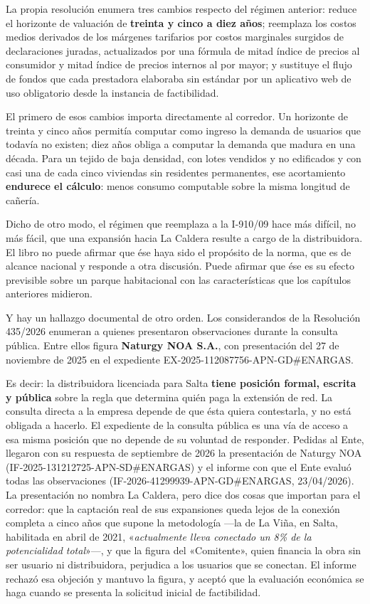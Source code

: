 La propia resolución enumera tres cambios respecto del régimen anterior: reduce el horizonte de valuación de \textbf{treinta y cinco a diez años}; reemplaza los costos medios derivados de los márgenes tarifarios por costos marginales surgidos de declaraciones juradas, actualizados por una fórmula de mitad índice de precios al consumidor y mitad índice de precios internos al por mayor; y sustituye el flujo de fondos que cada prestadora elaboraba sin estándar por un aplicativo web de uso obligatorio desde la instancia de factibilidad.

\begin{cautela}
El primero de esos cambios importa directamente al corredor. Un horizonte de treinta y cinco años permitía computar como ingreso la demanda de usuarios que todavía no existen; diez años obliga a computar la demanda que madura en una década. Para un tejido de baja densidad, con lotes vendidos y no edificados y con casi una de cada cinco viviendas sin residentes permanentes, ese acortamiento \textbf{endurece el cálculo}: menos consumo computable sobre la misma longitud de cañería.

Dicho de otro modo, el régimen que reemplaza a la I-910/09 hace más difícil, no más fácil, que una expansión hacia La Caldera resulte a cargo de la distribuidora. El libro no puede afirmar que ése haya sido el propósito de la norma, que es de alcance nacional y responde a otra discusión. Puede afirmar que ése es su efecto previsible sobre un parque habitacional con las características que los capítulos anteriores midieron.
\end{cautela}

Y hay un hallazgo documental de otro orden. Los considerandos de la Resolución 435/2026 enumeran a quienes presentaron observaciones durante la consulta pública. Entre ellos figura \textbf{Naturgy NOA S.A.}, con presentación del 27 de noviembre de 2025 en el expediente EX-2025-112087756-APN-GD\#ENARGAS.

Es decir: la distribuidora licenciada para Salta \textbf{tiene posición formal, escrita y pública} sobre la regla que determina quién paga la extensión de red. La consulta directa a la empresa depende de que ésta quiera contestarla, y no está obligada a hacerlo. El expediente de la consulta pública es una vía de acceso a esa misma posición que no depende de su voluntad de responder. Pedidas al Ente, llegaron con su respuesta de septiembre de 2026 la presentación de Naturgy NOA (IF-2025-131212725-APN-SD\#ENARGAS) y el informe con que el Ente evaluó todas las observaciones (IF-2026-41299939-APN-GD\#ENARGAS, 23/04/2026). La presentación no nombra La Caldera, pero dice dos cosas que importan para el corredor: que la captación real de sus expansiones queda lejos de la conexión completa a cinco años que supone la metodología ---la de La Viña, en Salta, habilitada en abril de 2021, «\textit{actualmente lleva conectado un 8\% de la potencialidad total}»---, y que la figura del «Comitente», quien financia la obra sin ser usuario ni distribuidora, perjudica a los usuarios que se conectan. El informe rechazó esa objeción y mantuvo la figura, y aceptó que la evaluación económica se haga cuando se presenta la solicitud inicial de factibilidad.

